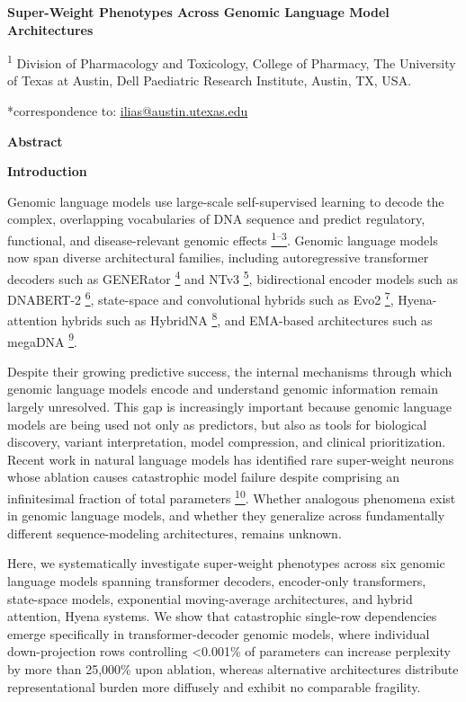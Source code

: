 \documentclass[11pt]{article}
\newcommand{\ul}[1]{\uline{#1}}
\begin{document}
\textbf{Super-Weight Phenotypes Across Genomic Language Model
Architectures}

\textsuperscript{1} Division of Pharmacology and Toxicology, College of
Pharmacy, The University of Texas at Austin, Dell Paediatric Research
Institute, Austin, TX, USA.

*correspondence to:
\href{mailto:ilias@austin.utexas.edu}{\ul{ilias@austin.utexas.edu}}

\textbf{Abstract}

\textbf{Introduction}

Genomic language models use large-scale self-supervised learning to
decode the complex, overlapping vocabularies of DNA sequence and predict
regulatory, functional, and disease-relevant genomic effects
\href{https://paperpile.com/c/FLFbSd/Fbg9+hmJS+Tixt}{\textsuperscript{1--3}}.
Genomic language models now span diverse architectural families,
including autoregressive transformer decoders such as GENERator
\href{https://paperpile.com/c/FLFbSd/wsei}{\textsuperscript{4}} and NTv3
\href{https://paperpile.com/c/FLFbSd/zg9K}{\textsuperscript{5}},
bidirectional encoder models such as DNABERT-2
\href{https://paperpile.com/c/FLFbSd/5VVM}{\textsuperscript{6}},
state-space and convolutional hybrids such as Evo2
\href{https://paperpile.com/c/FLFbSd/j27Z}{\textsuperscript{7}},
Hyena-attention hybrids such as HybridNA
\href{https://paperpile.com/c/FLFbSd/HqTS}{\textsuperscript{8}}, and
EMA-based architectures such as megaDNA
\href{https://paperpile.com/c/FLFbSd/0vKI}{\textsuperscript{9}}.

Despite their growing predictive success, the internal mechanisms
through which genomic language models encode and understand genomic
information remain largely unresolved. This gap is increasingly
important because genomic language models are being used not only as
predictors, but also as tools for biological discovery, variant
interpretation, model compression, and clinical prioritization. Recent
work in natural language models has identified rare super-weight neurons
whose ablation causes catastrophic model failure despite comprising an
infinitesimal fraction of total parameters
\href{https://paperpile.com/c/FLFbSd/h0C1}{\textsuperscript{10}}.
Whether analogous phenomena exist in genomic language models, and
whether they generalize across fundamentally different sequence-modeling
architectures, remains unknown.

Here, we systematically investigate super-weight phenotypes across six
genomic language models spanning transformer decoders, encoder-only
transformers, state-space models, exponential moving-average
architectures, and hybrid attention, Hyena systems. We show that
catastrophic single-row dependencies emerge specifically in
transformer-decoder genomic models, where individual down-projection
rows controlling \textless0.001\% of parameters can increase perplexity
by more than 25,000\% upon ablation, whereas alternative architectures
distribute representational burden more diffusely and exhibit no
comparable fragility.
\end{document}
